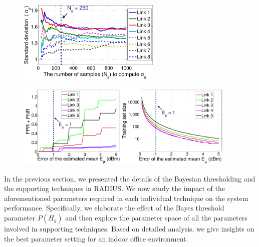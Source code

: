 \begin{figure}[t]
	\centering
	\begin{minipage}{.35\textwidth}
		\centering
		\includegraphics[width=1\linewidth, height=4cm]{1-Find_N_sigma3}
		\vspace{-0.75cm}
		\vspace{-0.5cm}
		\label{fig:Nsigma}
	\end{minipage} \hfill
	\begin{minipage}{.6\textwidth}
		\centering
		\includegraphics[width=1\linewidth, height=4cm]{2-Find_MeanError4}
		\vspace{-0.75cm}
		\vspace{-0.5cm}
		\label{fig:ErrorMean}
	\end{minipage}
\end{figure}

In the previous section, we presented the details of the Bayesian thresholding and the supporting techniques in RADIUS. We now study the impact of the aforementioned parameters required in each individual technique on the system performance. Specifically, we elaborate the effect of the Bayes threshold parameter $P(H_g)$ and then explore the parameter space of all the parameters involved in supporting techniques. Based on detailed analysis, we give insights on the best parameter setting for an indoor office environment.

